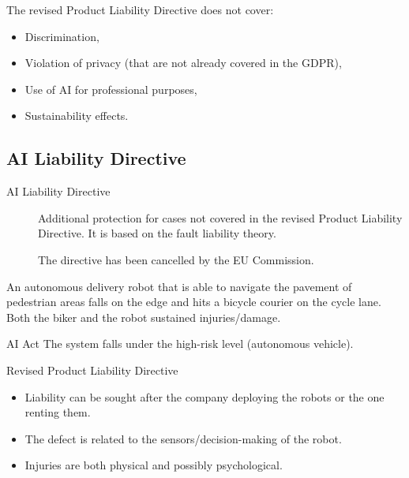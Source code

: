 \begin{remark}
    The revised Product Liability Directive does not cover:
    \begin{itemize}
        \item Discrimination,
        \item Violation of privacy (that are not already covered in the GDPR),
        \item Use of AI for professional purposes,
        \item Sustainability effects.
    \end{itemize}
\end{remark}


\subsection{AI Liability Directive}

\begin{description}
    \item[AI Liability Directive] 
        Additional protection for cases not covered in the revised Product Liability Directive. It is based on the fault liability theory.

        The directive has been cancelled by the EU Commission.
\end{description}


\begin{example}
    An autonomous delivery robot that is able to navigate the pavement of pedestrian areas falls on the edge and hits a bicycle courier on the cycle lane. Both the biker and the robot sustained injuries/damage.
    
    \begin{descriptionlist}
        \item[AI Act] The system falls under the high-risk level (autonomous vehicle).
        \item[Revised Product Liability Directive] \phantom{}
            \begin{itemize}
                \item Liability can be sought after the company deploying the robots or the one renting them.
                \item The defect is related to the sensors/decision-making of the robot.
                \item Injuries are both physical and possibly psychological.
            \end{itemize}
    \end{descriptionlist}
\end{example}

